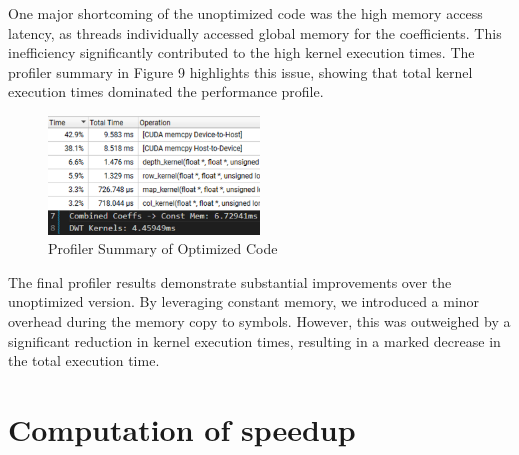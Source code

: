 \documentclass[journal,11pt]{IEEEtran}
\begin{document}
One major shortcoming of the unoptimized code was the high memory access latency, as threads individually accessed global memory for the coefficients. This inefficiency significantly contributed to the high kernel execution times. The profiler summary in Figure 9 highlights this issue, showing that total kernel execution times dominated the performance profile.

\begin{figure}[h] \centering \includegraphics[width=0.5\textwidth]{assets/optim-sum.png} \caption{Profiler Summary of Optimized Code} \label{fig:10} \end{figure}

The final profiler results demonstrate substantial improvements over the unoptimized version. By leveraging constant memory, we introduced a minor overhead during the memory copy to symbols. However, this was outweighed by a significant reduction in kernel execution times, resulting in a marked decrease in the total execution time.

\section{Computation of speedup}
\end{document}
